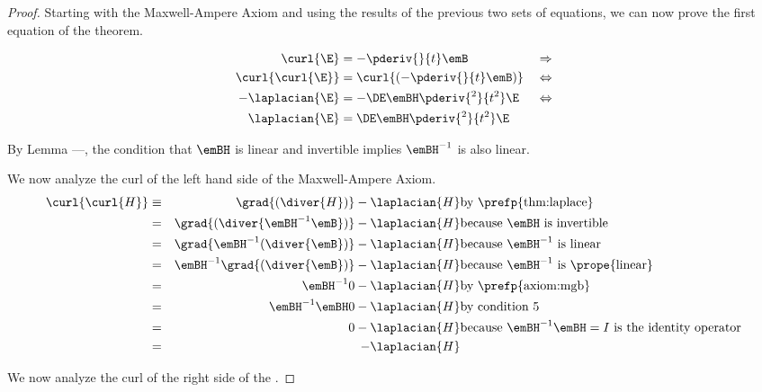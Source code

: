 \begin{proof}
Starting with the Maxwell-Ampere Axiom and using
the results of the previous two sets of equations, we can now prove
the first equation of the theorem.

\begin{align*}
   \curl{\E}        &= -\pderiv{}{t}\emB                     && \Rightarrow \\
   \curl{\curl{\E}} &= \curl{(-\pderiv{}{t}\emB)}            && \Leftrightarrow \\
   - \laplacian{\E} &= -\DE \emBH \pderiv{^2}{t^2}\E         && \Leftrightarrow \\
   \laplacian{\E}   &= \DE \emBH \pderiv{^2}{t^2}\E
\end{align*}



By Lemma ---, %
the condition that $\emBH$ is linear and invertible implies $\emBH^{-1}$ is also linear.

We now analyze the curl of the left hand side of the Maxwell-Ampere Axiom.
\begin{align*}
   \curl{\curl{H}}
   &\equiv& \grad{(\diver{H})} - \laplacian{H}
   & \text{by \prefp{thm:laplace}}
   \\ &=&
   \grad{(\diver{\emBH^{-1}\emB})} - \laplacian{H}
   & \text{because $\emBH$ is invertible}
   \\ &=&
   \grad{\emBH^{-1}(\diver{\emB})} - \laplacian{H}
   & \text{because $\emBH^{-1}$ is linear}
   \\ &=&
   \emBH^{-1}\grad{(\diver{\emB})} - \laplacian{H}
   & \text{because $\emBH^{-1}$ is \prope{linear}}
   \\ &=&
   \emBH^{-1}0 - \laplacian{H}
   & \text{by \prefp{axiom:mgb}}
   \\ &=&
   \emBH^{-1}\emBH 0 - \laplacian{H}
   & \text{by condition 5}
   \\ &=&
   0 - \laplacian{H}
   & \text{because $\emBH^{-1}\emBH=I$ is the identity operator}
   \\ &=&
   - \laplacian{H}
\end{align*}

We now analyze the curl of the right side of the  .


\end{proof}
